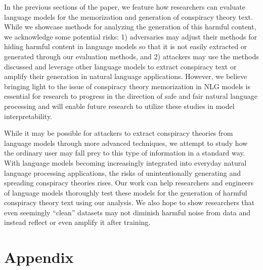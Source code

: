 \documentclass[11pt,a4paper]{article}
\begin{document}
In the previous sections of the paper, we feature how researchers can evaluate language models for the memorization and generation of conspiracy theory text. While we showcase methods for analyzing the generation of this harmful content, we acknowledge some potential risks: 1) adversaries may adjust their methods for hiding harmful content in language models so that it is not easily extracted or generated through our evaluation methods, and 2) attackers may use the methods discussed and leverage other language models to extract conspiracy text or amplify their generation in natural language applications. However, we believe bringing light to the issue of conspiracy theory memorization in NLG models is essential for research to progress in the direction of safe and fair natural language processing and will enable future research to utilize these studies in model interpretability. 

While it may be possible for attackers to extract conspiracy theories from language models through more advanced techniques, we attempt to study how the ordinary user may fall prey to this type of information in a standard way. With language models becoming increasingly integrated into everyday natural language processing applications, the risks of unintentionally generating and spreading conspiracy theories rises. Our work can help researchers and engineers of language models thoroughly test these models for the generation of harmful conspiracy theory text using our analysis. We also hope to show researchers that even seemingly ``clean'' datasets may not diminish harmful noise from data and instead reflect or even amplify it after training.







\appendix
\section{Appendix} \label{sec:appendix}
\end{document}
